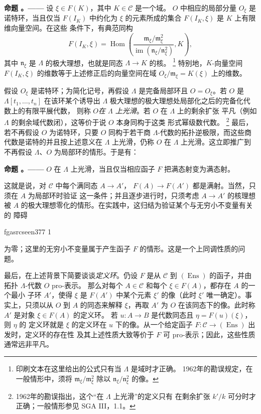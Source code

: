 \documentclass[12pt,twoside,openany]{book}
\numberwithin{equation}{section}
\newcommand{\fgaunitid}{unbound}
\newcommand{\src}[1]{%
  \phantomsection
  \hypertarget{src:\fgaunitid:#1}{}%
  \hypertarget{fga.\fgaunitid.p#1}{}%
  \ifcsname fgasrcseen#1\endcsname\else
    \expandafter\gdef\csname fgasrcseen#1\endcsname{1}%
    \hypertarget{src:#1}{}%
  \fi
  \marginpar{\raggedleft\footnotesize\sffamily #1}%
}
\newcommand{\fquote}[1]{“#1”}
\theoremstyle{plain}
\theoremstyle{definition}
\theoremstyle{remark}
\newcommand{\result}[2]{%
  \par\medskip\noindent\textbf{#1%
  \if\relax\detokenize{#2}\relax\else\space#2\fi。——}\enspace
}
\begin{document}
\result{命题}{5.1} 设 $\xi\in F(K)$，其中 $K\in\mathcal C$ 是一个域。
$O$ 中相应的局部分量 $O_\xi$ 是诺特环，当且仅当 $F(I_K)$ 中约化为
$\xi$ 的元素所成的集合 $F(I_K,\xi)$ 是 $K$ 上有限维向量空间。在这些
条件下，有典范同构
\[
  F(I_K,\xi)=
  \operatorname{Hom}\!\left(
    \frac{\mathfrak m_\xi/\mathfrak m_\xi^2}
         {\operatorname{im}(\mathfrak n_\xi/\mathfrak n_\xi^2)},K
  \right),
\]
其中 $\mathfrak n_\xi$ 是 $\Lambda$ 的极大理想，也就是同态
$\Lambda\longrightarrow K$ 的核。
\footnote{印刷文本在这里给出的公式只有当 $\Lambda$ 是域时才正确。
1962年的勘误规定，在一般情形中，须将
$\mathfrak m_\xi/\mathfrak m_\xi^2$ 除以
$\mathfrak n_\xi/\mathfrak n_\xi^2$ 的像。}
特别地，$K$-向量空间 $F(I_K,\xi)$ 的维数等于上述修正后的向量空间在域
$O_\xi/\mathfrak m_\xi=K(\xi)$ 上的维数。

假设 $O_\xi$ 是诺特环；为简化记号，再假设 $\Lambda$ 是完备局部环且
$O=O_\xi$。若 $O$ 是 $\Lambda[t_1,\ldots,t_n]$ 在该环某个诱导出
$\Lambda$ 极大理想的极大理想处局部化之后的完备化代数上的有限平展代数，
则称 $O$\emph{在 $\Lambda$ 上光滑}。若 $O$ 在 $\Lambda$ 上的剩余扩张
平凡（例如 $\Lambda$ 的剩余域代数闭），这等价于说 $O$ 本身同构于这类
形式幂级数代数。
\footnote{1962年的勘误指出，这个\fquote{在 $\Lambda$ 上光滑}的定义只有
在剩余扩张 $k'/k$ 可分时才正确；一般情形参见 SGA III，1.1。}
最后，若不再假设 $O$ 为诺特环，只要 $O$ 同构于若干商
$\Lambda$-代数的拓扑逆极限，而这些商代数是诺特的并且按上述意义在
$\Lambda$ 上光滑，仍称 $O$ 在 $\Lambda$ 上光滑。这立即推广到不再假设
$\Lambda$、$O$ 为局部环的情形。于是有：

\result{命题}{5.2} $O$ 在 $\Lambda$ 上光滑，当且仅当相应函子 $F$
把满态射变为满态射。

这就是说，对 $\mathcal C$ 中每个满同态 $A\longrightarrow A'$，
$F(A)\longrightarrow F(A')$ 都是满射。当然，只须在 $A$ 为局部环时验证
这一条件；并且逐步进行时，只须考虑 $A\longrightarrow A'$ 的核理想被
$A$ 的极大理想零化的情形。在实践中，这归结为验证某个与无穷小不变量有关的
障碍

\src{377}
为零；这里的无穷小不变量属于产生函子 $F$ 的情形。这是一个上同调性质的问题。

最后，在上述背景下简要谈谈\emph{定义环}。仍设 $F$ 是从 $\mathcal C$ 到
$(\operatorname{Ens})$ 的函子，并由拓扑 $\Lambda$-代数 $O$ pro-表示。
那么对每个 $A\in\mathcal C$ 和每个 $\xi\in F(A)$，都存在 $A$ 的一个最小
子环 $A'$，使得 $\xi$ 是 $F(A')$ 中某个元素 $\xi'$ 的像（此时 $\xi'$
唯一确定）。事实上，只须以从 $O$ 到 $A$ 的同态来解释 $\xi$，再取
$A'$ 为 $O$ 在该同态下的像。此时称 $A'$ 是对象 $\xi\in F(A)$ 的定义环。
若 $u:A\longrightarrow B$ 是代数同态且 $\eta=F(u)(\xi)$，则 $\eta$ 的
定义环就是 $\xi$ 的定义环在 $u$ 下的像。从一个给定函子
$F:\mathcal C\longrightarrow(\operatorname{Ens})$ 出发时，定义环的存在性
及其上述性质大致等价于 $F$ 可 pro-表示；因此，这些性质通常远非平凡。
\end{document}
